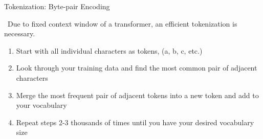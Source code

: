 \documentclass[aspectratio=169,xcolor=dvipsnames,svgnames,x11names,fleqn]{beamer}
\begin{document}
\begin{frame}[fragile]{Tokenization: Byte-pair Encoding}
    \begin{tcolorbox}[colback=bpeIndigo!5, colframe=bpeIndigo, arc=1mm]
        \small \faExclamationCircle \ Due to fixed context window of a transformer, an efficient tokenization is necessary.
    \end{tcolorbox}

    \begin{tcolorbox}[enhanced, title=Byte-pair Encoding, colframe=bpeIndigo, colback=white, attach boxed title to top left={xshift=3mm, yshift=-2mm}, boxed title style={colback=bpeIndigo}]
        \begin{enumerate}
            \item \small \textcolor{bpeIndigo}{\faArrowRight} Start with all individual characters as tokens, (a, b, c, etc.)
            \item \small \textcolor{bpeIndigo}{\faArrowRight} Look through your training data and find the most common pair of adjacent characters
            \item \small \textcolor{bpeIndigo}{\faArrowRight} Merge the most frequent pair of adjacent tokens into a new token and add to your vocabulary
            \item \small \textcolor{bpeIndigo}{\faArrowRight} Repeat steps 2-3 thousands of times until you have your desired vocabulary size
        \end{enumerate}
    \end{tcolorbox}
\end{frame}
\end{document}
